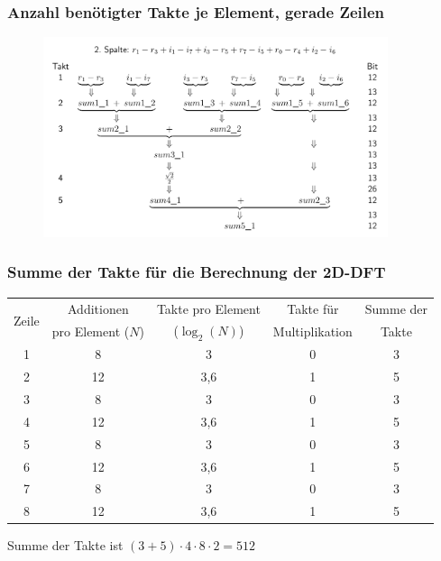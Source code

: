 \begin{frame}\frametitle{Anzahl benötigter Takte je Element, gerade Zeilen}
\begin{figure}
 \centering
 \includegraphics[width=0.9\textwidth]{img/geradeZeilen.png}
\end{figure}
\end{frame}


\begin{frame}\frametitle{Summe der Takte für die Berechnung der 2D-DFT}
\begin{table}[ht!]
\centering
\begin{tabular}{ccccc}
\hline
\multirow{2}{*}{Zeile} & Additionen & Takte pro Element & Takte für & Summe der\\
     & pro Element ($N$) & ($\log_2(N)$) & Multiplikation & Takte\\
\hline
1& 8  & 3   &0 &3\\
2& 12 & 3,6 &1 &5\\
3& 8  & 3   &0 &3\\
4& 12 & 3,6 &1 &5\\
5& 8  & 3   &0 &3\\
6& 12 & 3,6 &1 &5\\
7& 8  & 3   &0 &3\\
8& 12 & 3,6 &1 &5\\
\hline
\end{tabular}
\end{table}
\medskip
\begin{center}
Summe der Takte ist $(3 + 5)\cdot 4 \cdot 8 \cdot 2 = 512$ 
\end{center}
\end{frame}


